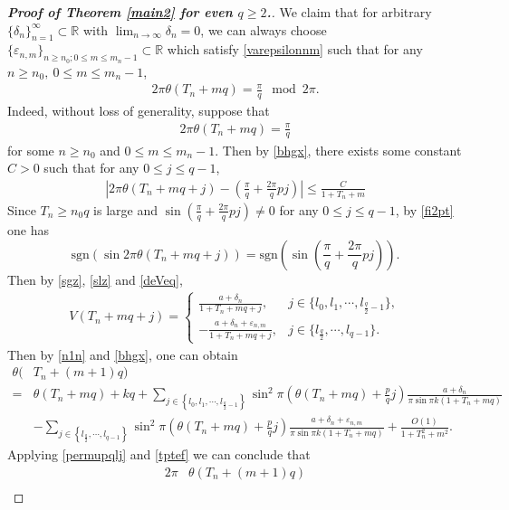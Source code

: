 \documentclass[12pt]{amsart}
\newcommand{\abs}[1]{\left\lvert #1 \right\rvert}
\theoremstyle{plain}
\newcommand{\R}{\mathbb{R}}
\theoremstyle{definition}
\begin{document}
\begin{proof}[\textbf{Proof of Theorem \ref{main2} for even $q\geq2$.}]
We claim that for arbitrary $\{\delta_n\}_{n=1}^{\infty}\subset\R$ with $\lim_{n\to\infty}\delta_n=0$, we can always choose $\{\varepsilon_{n,m}\}_{n\geq n_0;0\leq m\leq m_n-1}\subset\R$ which satisfy \eqref{varepsilonnm} 
such that for any $n\geq n_0,\ 0\leq m\leq m_n-1$,
\begin{align}
2\pi\theta(T_{n}+mq)=\frac{\pi}{q}\mod2\pi.\label{tpm2pf}
\end{align}
Indeed, without loss of generality, suppose that 
\begin{align}
	2\pi \theta(T_n+mq)=\frac{\pi}{q}\label{tptef}
\end{align}
for some $n\geq n_0$ and $0\leq m\leq m_n-1$. 
Then by \eqref{bhgx}, there exists some constant $C>0$ such that for any $0\leq j\leq q-1$,
\begin{align}
	\abs{2\pi\theta(T_n+mq+j)-\left(\frac{\pi}{q}+\frac{2\pi}{q}pj\right)}\leq \frac{C}{1+T_n+m}\label{fi2pt}
\end{align}
Since $T_n\geq n_0q$ is large and $\sin \left(\frac{\pi}{q}+\frac{2\pi}{q}pj\right)\neq 0$ for any $0\leq j\leq q-1$, by \eqref{fi2pt} one has $$\mathrm{sgn}(\sin2\pi\theta(T_n+mq+j))=\mathrm{sgn}\left(\sin\left(\frac{\pi}{q}+\frac{2\pi}{q}pj\right)\right).$$ 
Then by \eqref{sgz}, \eqref{slz} and \eqref{deVeq},
\begin{align}
V(T_n+mq+j)=\begin{cases}
				\frac{a+\delta_{n}}{1+{T}_{n}+mq+j}, & j\in\{l_0,l_1,\cdots,l_{\frac{q}{2}-1}\},\\
				-\frac{a+\delta_{n}+\varepsilon_{n,m}}{1+{T}_{n}+mq+j}, & j\in\{l_{\frac{q}{2}},\cdots,l_{q-1}\}.\label{devcrieq}
			\end{cases}
\end{align}
Then by \eqref{n1n} and \eqref{bhgx}, one can obtain
\begin{align}
\theta(&T_n+(m+1)q)\nonumber\\
=&\theta(T_n+mq)+ kq+\sum_{j\in\left\{l_0,l_1,\cdots,l_{\frac{q}{2}-1}\right\}}\sin^2\pi\left(\theta(T_n+mq)+\frac{p}{q}j\right)\frac{a+\delta_n}{\pi\sin\pi k(1+T_n+mq)}\nonumber\\
&-\sum_{j\in\left\{l_{\frac{q}{2}},\cdots,l_{q-1}\right\}}\sin^2\pi\left(\theta(T_n+mq)+\frac{p}{q}j\right)\frac{a+\delta_n+\varepsilon_{n,m}}{\pi\sin\pi k(1+T_n+mq)}+\frac{O(1)}{1+T_n^2+m^2}.\nonumber
\end{align}
Applying \eqref{permupqlj} and \eqref{tptef} we can conclude that
\begin{align}
2\pi&\theta(T_n+(m+1)q)\nonumber\\

\end{align}
\end{proof}
\end{document}
